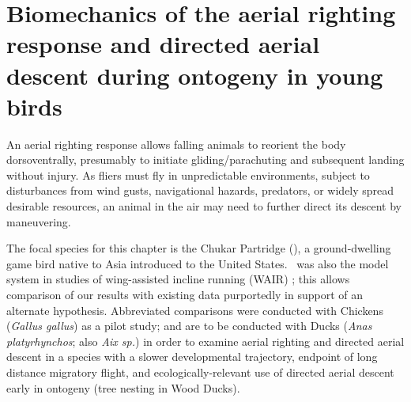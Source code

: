 
\section{Biomechanics of the aerial righting response and directed aerial descent during ontogeny in young birds}
\label{sec:0Chukar}
An aerial righting response allows falling animals to reorient the body dorsoventrally, presumably to initiate gliding/parachuting and subsequent landing without injury.  As fliers must fly in unpredictable environments, subject to disturbances from wind gusts, navigational hazards, predators, or widely spread desirable resources, an animal in the air may need to further direct its descent by maneuvering.

The focal species for this chapter is the Chukar Partridge (\Alectorischukar), a ground-dwelling game bird native to Asia introduced to the United States.  \Achukar\ was also the model system in studies of wing-assisted incline running (WAIR) \citep{Dial:2003, Dial:2008}; this allows comparison of our results with existing data purportedly in support of an alternate hypothesis.  Abbreviated comparisons were conducted with Chickens (\emph{Gallus gallus}) as a pilot study; and are to be conducted with Ducks (\emph{Anas platyrhynchos}; also \emph{Aix sp.}) in order to examine aerial righting and directed aerial descent in a species with a slower developmental trajectory, endpoint of long distance migratory flight, and ecologically-relevant use of directed aerial descent early in ontogeny (tree nesting in Wood Ducks).


